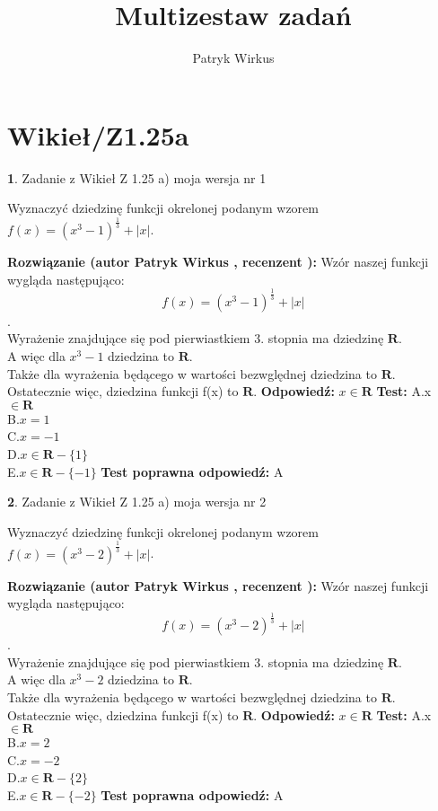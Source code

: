 \documentclass[12pt, a4paper]{article}
\title{Multizestaw zadań}
\author{Patryk Wirkus}
\date{}
\theoremstyle{definition} %
\newtheorem{zad}{}
\newcommand{\kategoria}[1]{\section{#1}}
\newcommand{\zadStart}[1]{\begin{zad}#1\newline}
\newcommand{\zadStop}{\end{zad}}
\newcommand{\rozwStart}[2]{\noindent \textbf{Rozwiązanie (autor #1 , recenzent #2): }\newline}
\newcommand{\rozwStop}{\newline}
\newcommand{\odpStart}{\noindent \textbf{Odpowiedź:}\newline}
\newcommand{\odpStop}{\newline}
\newcommand{\testStart}{\noindent \textbf{Test:}\newline}
\newcommand{\testStop}{\newline}
\newcommand{\kluczStart}{\noindent \textbf{Test poprawna odpowiedź:}\newline}
\newcommand{\kluczStop}{\newline}
\begin{document}
\maketitle

\kategoria{Wikieł/Z1.25a}


\zadStart{Zadanie z Wikieł Z 1.25 a) moja wersja nr 1}

Wyznaczyć dziedzinę funkcji okrelonej podanym wzorem $f(x) = (x^{3}-1)^{\frac{1}{3}} + |x|$.
\zadStop
\rozwStart{Patryk Wirkus}{}
Wzór naszej funkcji wygląda następująco:
$$f(x) = (x^{3}-1)^{\frac{1}{3}} + |x|$$.\\
Wyrażenie znajdujące się pod pierwiastkiem 3. stopnia ma dziedzinę $\mathbf{R}$.\\ A więc dla $x^{3}-1$ dziedzina to $\mathbf{R}$.\\ Także dla wyrażenia będącego w wartości bezwględnej dziedzina to $\mathbf{R}$.\\
Ostatecznie więc, dziedzina funkcji f(x) to $\mathbf{R}$.
\rozwStop
\odpStart
$x \in \mathbf{R}$
\odpStop
\testStart
A.x $\in \mathbf{R}$\\ B.$x = 1$\\ C.$x = -1$\\ D.$x \in \mathbf{R} - \{1\}$\\ E.$x \in \mathbf{R} - \{-1\}$
\testStop
\kluczStart
A
\kluczStop



\zadStart{Zadanie z Wikieł Z 1.25 a) moja wersja nr 2}

Wyznaczyć dziedzinę funkcji okrelonej podanym wzorem $f(x) = (x^{3}-2)^{\frac{1}{3}} + |x|$.
\zadStop
\rozwStart{Patryk Wirkus}{}
Wzór naszej funkcji wygląda następująco:
$$f(x) = (x^{3}-2)^{\frac{1}{3}} + |x|$$.\\
Wyrażenie znajdujące się pod pierwiastkiem 3. stopnia ma dziedzinę $\mathbf{R}$.\\ A więc dla $x^{3}-2$ dziedzina to $\mathbf{R}$.\\ Także dla wyrażenia będącego w wartości bezwględnej dziedzina to $\mathbf{R}$.\\
Ostatecznie więc, dziedzina funkcji f(x) to $\mathbf{R}$.
\rozwStop
\odpStart
$x \in \mathbf{R}$
\odpStop
\testStart
A.x $\in \mathbf{R}$\\ B.$x = 2$\\ C.$x = -2$\\ D.$x \in \mathbf{R} - \{2\}$\\ E.$x \in \mathbf{R} - \{-2\}$
\testStop
\kluczStart
A
\kluczStop
\end{document}
